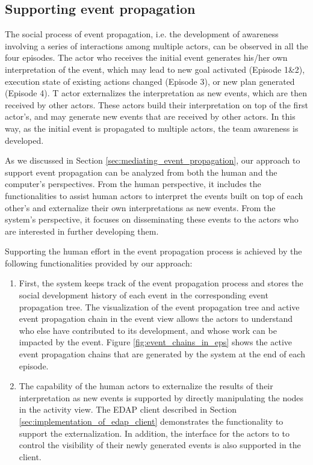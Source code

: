 \subsection{Supporting event propagation} %
\label{sub:supporting_event_propagation}
The social process of event propagation, i.e. the development of awareness involving a series of interactions among multiple actors, can be observed in all the four episodes. The actor who receives the initial event generates his/her own interpretation of the event, which may lead to new goal activated (Episode 1\&2), execution state of existing actions changed (Episode 3), or new plan generated (Episode 4). T actor externalizes the interpretation as new events, which are then received by other actors. These actors build their interpretation on top of the first actor’s, and may generate new events that are received by other actors. In this way, as the initial event is propagated to multiple actors, the team awareness is developed.

As we discussed in Section \ref{sec:mediating_event_propagation}, our approach to support event propagation can be analyzed from both the human and the computer's perspectives. From the human perspective, it includes the functionalities to assist human actors to interpret the events built on top of each other’s and externalize their own interpretations as new events. From the system's perspective, it focuses on disseminating these events to the actors who are interested in further developing them.

Supporting the human effort in the event propagation process is achieved by the following functionalities provided by our approach:

\begin{enumerate}
	\item First, the system keeps track of the event propagation process and stores the social development history of each event in the corresponding event propagation tree. The visualization of the event propagation tree and active event propagation chain in the event view allows the actors to understand who else have contributed to its development, and whose work can be impacted by the event. Figure \ref{fig:event_chains_in_eps} shows the active event propagation chains that are generated by the system at the end of each episode.
	\item The capability of the human actors to externalize the results of their interpretation as new events is supported by directly manipulating the nodes in the activity view. The EDAP client described in Section \ref{sec:implementation_of_edap_client} demonstrates the functionality to support the externalization. In addition, the interface for the actors to to control the visibility of their newly generated events is also supported in the client.
\end{enumerate}

